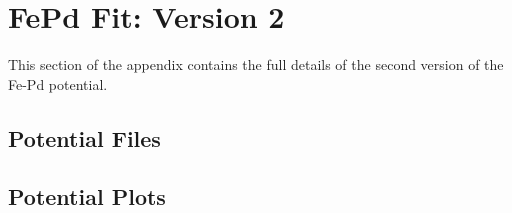 \chapter{FePd Fit: Version 2}
\label{section:pdfefit2}


This section of the appendix contains the full details of the second version of the Fe-Pd potential.

\FloatBarrier
\section{Potential Files}
\label{section:fepdv2potfiles}






















\FloatBarrier
\section{Potential Plots}
\label{section:fepdv2potplots}

